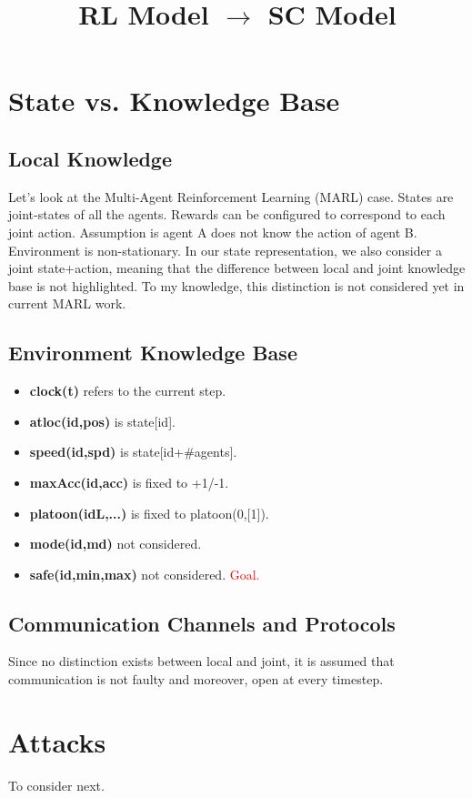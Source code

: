 \documentclass[a4paper,11pt]{article}
\begin{document}
\date{}

\title{RL Model $\rightarrow$ SC Model}


\maketitle 


\section{State vs. Knowledge Base}
\subsection{Local Knowledge} 
Let's look at the Multi-Agent Reinforcement Learning (MARL) case.
States are joint-states of all the agents. Rewards can be configured to correspond to each joint action.
Assumption is agent A does not know the action of agent B. Environment is non-stationary. \newline
In our state representation, we also consider a joint state+action, meaning that the difference between local 
and joint knowledge base is not highlighted. To my knowledge, this distinction is not considered yet in current MARL work. 

\subsection{Environment Knowledge Base}
\begin{itemize}
    \item \textbf{clock(t)} refers to the current step. 
    \item \textbf{atloc(id,pos)} is state[id]. 
    \item \textbf{speed(id,spd)} is state[id+#agents]. 
    \item \textbf{maxAcc(id,acc)} is fixed to +1/-1. 
    \item \textbf{platoon(idL,...)} is fixed to platoon(0,[1]).
    \item \textbf{mode(id,md)} not considered.
    \item \textbf{safe(id,min,max)} not considered. \textcolor{red}{Goal.} 
\end{itemize}

\subsection{Communication Channels and Protocols}
Since no distinction exists between local and joint, it is assumed that communication is not faulty
and moreover, open at every timestep. 

\section{Attacks}
To consider next. 
\end{document}
